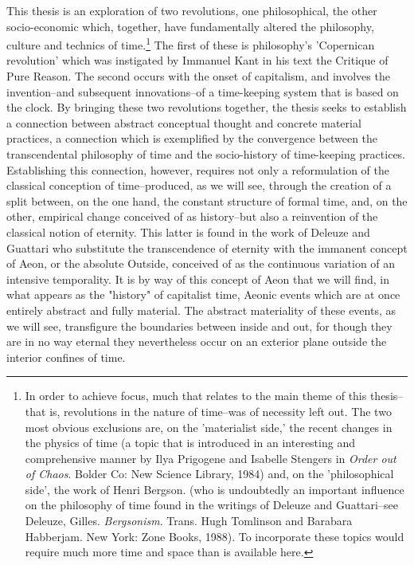 This thesis is an exploration of two revolutions, one philosophical, the other socio-economic which, together, have fundamentally altered the philosophy, culture and technics of time.\footnote{In order to achieve focus, much that relates to the main theme of this thesis--that is, revolutions in the nature of time--was of necessity left out. The two most obvious exclusions are, on the 'materialist side,' the recent changes in the physics of time (a topic that is introduced in an interesting and comprehensive manner by Ilya Prigogene and Isabelle Stengers in \textit{Order out of Chaos}. Bolder Co: New Science Library, 1984) and, on the 'philosophical side', the work of Henri Bergson. (who is undoubtedly an important influence on the philosophy of time found in the writings of Deleuze and Guattari--see Deleuze, Gilles. \textit{Bergsonism}. Trans. Hugh Tomlinson and Barabara Habberjam. New York: Zone Books, 1988). To incorporate these topics would require much more time and space than is available here.} The first of these is philosophy's 'Copernican revolution' which was instigated by Immanuel Kant in his text the Critique of Pure Reason. The second occurs with the onset of capitalism, and involves the invention--and subsequent innovations--of a time-keeping  system that is based on the clock. By bringing these two revolutions together, the thesis seeks to establish a connection between abstract conceptual thought and concrete material practices, a connection which is exemplified by the convergence between the transcendental philosophy of time and the socio-history of time-keeping practices. Establishing this connection, however, requires not only a reformulation of the classical conception of time--produced, as we will see, through the creation of a split between, on the one hand, the constant structure of formal time, and, on the other, empirical change conceived of as history--but also a reinvention of the classical notion of eternity. This latter is found in the work of Deleuze and Guattari who substitute the transcendence of eternity with the immanent concept of Aeon, or the absolute Outside, conceived of as the continuous variation of an intensive temporality. It is by way of this concept of Aeon that we will find, in what appears as the "history" of capitalist time, Aeonic events which are at once entirely abstract and fully material. The abstract materiality of these events, as we will see, transfigure the boundaries between inside and out, for though they are in no way eternal they nevertheless occur on an exterior plane outside the interior confines of time. 

